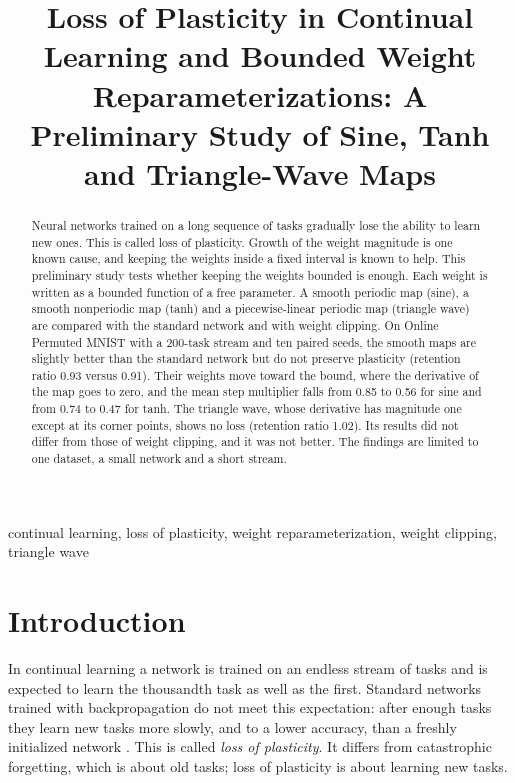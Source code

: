 \documentclass[conference,a4paper]{IEEEtran}
\begin{document}
\title{Loss of Plasticity in Continual Learning and Bounded Weight Reparameterizations:
A Preliminary Study of Sine, Tanh and Triangle-Wave Maps}

\author{}

\maketitle

\begin{abstract}
Neural networks trained on a long sequence of tasks gradually lose the ability to learn new ones. This is called loss of plasticity. Growth of the weight magnitude is one known cause, and keeping the weights inside a fixed interval is known to help. This preliminary study tests whether keeping the weights bounded is enough. Each weight is written as a bounded function of a free parameter. A smooth periodic map (sine), a smooth nonperiodic map (tanh) and a piecewise-linear periodic map (triangle wave) are compared with the standard network and with
weight clipping. On Online Permuted MNIST with a 200-task stream and ten paired seeds, the smooth maps are
slightly better than the standard network but do not preserve plasticity (retention ratio 0.93 versus 0.91).
Their weights move toward the bound, where the derivative of the map goes to zero, and the mean step
multiplier falls from 0.85 to 0.56 for sine and from 0.74 to 0.47 for tanh. The triangle wave, whose derivative has magnitude one except at its corner points, shows no loss (retention ratio 1.02). Its results did not differ from those of weight clipping, and it was not better. The findings are limited to one
dataset, a small network and a short stream.
\end{abstract}

\begin{IEEEkeywords}
continual learning, loss of plasticity, weight reparameterization, weight clipping, triangle wave
\end{IEEEkeywords}

\section{Introduction}

In continual learning a network is trained on an endless stream of tasks and is expected to learn the
thousandth task as well as the first. Standard networks trained with backpropagation do not meet this
expectation: after enough tasks they learn new tasks more slowly, and to a lower accuracy, than a freshly
initialized network \cite{ash2020warm,lyle2023understanding,dohare2024loss}. This is called \emph{loss of plasticity}. It differs from catastrophic forgetting, which is about old tasks; loss of plasticity is about learning new tasks.
\end{document}
